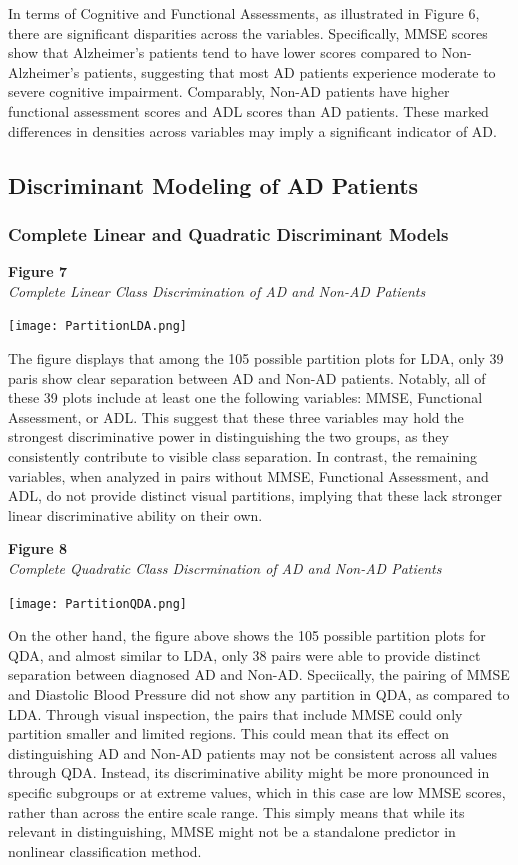 \documentclass[12pt]{article}
\begin{document}
In terms of Cognitive and Functional Assessments, as illustrated in Figure 6, there are significant disparities across the variables. Specifically, MMSE scores show that Alzheimer's patients tend 
to have lower scores compared to Non-Alzheimer's patients, suggesting that most AD patients experience moderate to severe cognitive impairment. Comparably, Non-AD patients have higher functional assessment
scores and ADL scores than AD patients. These marked differences in densities across variables may imply a significant indicator of AD. 

\subsection{Discriminant Modeling of AD Patients}
\subsubsection{Complete Linear and Quadratic Discriminant Models}
\noindent
\textbf{Figure 7}\\
\textit{Complete Linear Class Discrimination of AD and Non-AD Patients}
\begin{center}
    \texttt{[image: PartitionLDA.png]}
\end{center}

The figure displays that among the 105 possible partition plots for LDA, only 39 paris show clear separation between AD and Non-AD patients. Notably, all of these 39 plots include at least one the following
variables: MMSE, Functional Assessment, or ADL. This suggest that these three variables may hold the strongest discriminative power  in distinguishing the two groups, as they consistently contribute to visible
class separation. In contrast, the remaining variables, when analyzed in pairs without MMSE, Functional Assessment, and ADL, do not provide distinct visual partitions, implying that these lack stronger linear 
discriminative ability on their own. 

\noindent
\textbf{Figure 8}\\
\textit{Complete Quadratic Class Discrmination of AD and Non-AD Patients}
\begin{center}
    \texttt{[image: PartitionQDA.png]}
\end{center}

On the other hand, the figure above shows the 105 possible partition plots for QDA, and almost similar to LDA, only 38 pairs were able to provide distinct separation between diagnosed AD and Non-AD. Speciically, the pairing of MMSE and Diastolic Blood 
Pressure did not show any partition in QDA, as compared to LDA. Through visual inspection, the pairs that include MMSE could only partition smaller and limited regions. This could mean that its effect on distinguishing AD and Non-AD patients may not be consistent 
across all values through QDA. Instead, its discriminative ability might be more pronounced in specific subgroups or at extreme values, which in this case are low MMSE scores, rather than across the entire scale range. This simply means that while its relevant in distinguishing, 
MMSE might not be a standalone predictor in nonlinear classification method. 
\end{document}
